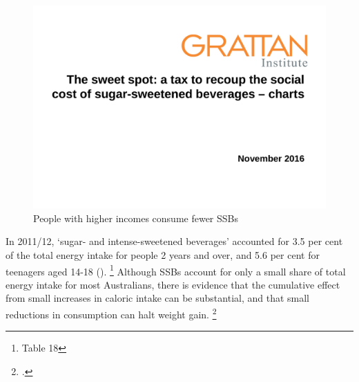 \documentclass[embargoed]{grattan}
\begin{document}
\begin{figure}
\caption{People with higher incomes consume fewer SSBs}\label{fig:people-higher-incomes-consumer-fewer-SSBs}

\includegraphics[page=8]{atlas/ObesityCharts}


\end{figure}



In 2011/12, `sugar- and intense-sweetened beverages' accounted for 3.5 per cent of the total energy intake for people 2 years and over, and 5.6 per cent for teenagers aged 14-18 ().%
\footnote{\textcite{ABS20144364055007AustralianHealth} Table 18} Although SSBs account for only a small share of total energy intake for most Australians, there is evidence that the cumulative effect from small increases in caloric intake can be substantial, and that small reductions in consumption can halt weight gain.%
\footcites{Fletcher2011Aresoftdrink}{Cutler2003WhyhaveAmericans}
\end{document}
